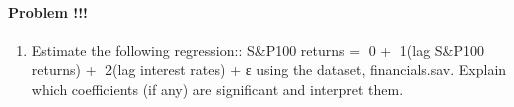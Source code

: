 \documentclass[]{article}
\providecommand{\tightlist}{%
  \setlength{\itemsep}{0pt}\setlength{\parskip}{0pt}}
\let\oldparagraph\paragraph
\renewcommand{\paragraph}[1]{\oldparagraph{#1}\mbox{}}
\begin{document}
\paragraph{Problem !!!}\label{problem-30}

\begin{enumerate}
\def\labelenumi{\arabic{enumi}.}
\setcounter{enumi}{40}
\tightlist
\item
  Estimate the following regression:: S\&P100 returns = 0 + 1(lag
  S\&P100 returns) + 2(lag interest rates) + ε using the dataset,
  financials.sav. Explain which coefficients (if any) are significant
  and interpret them.
\end{enumerate}

\subsection{}\label{section}
\end{document}
